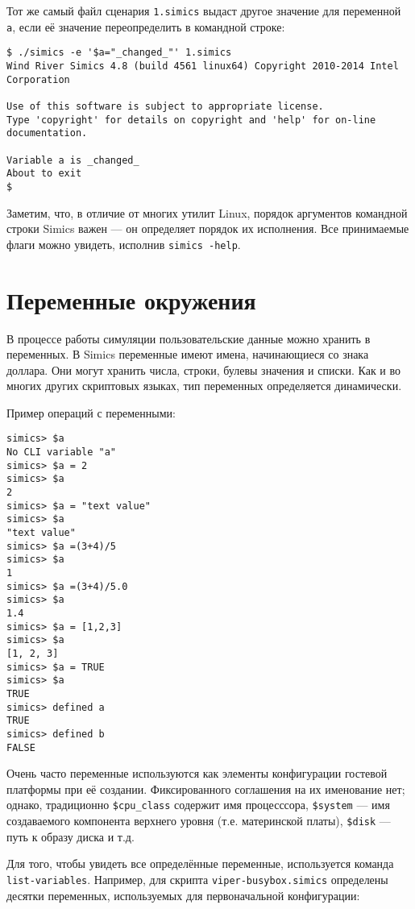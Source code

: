 \begin{enumerate*}
Тот же самый файл сценария \texttt{1.simics} выдаст другое значение для переменной \texttt{a}, если её значение переопределить в командной строке:

\begin{lstlisting}
$ ./simics -e '$a="_changed_"' 1.simics
Wind River Simics 4.8 (build 4561 linux64) Copyright 2010-2014 Intel Corporation

Use of this software is subject to appropriate license.
Type 'copyright' for details on copyright and 'help' for on-line documentation.

Variable a is _changed_
About to exit
$
\end{lstlisting}

Заметим, что, в отличие от многих утилит Linux, порядок аргументов командной строки Simics важен --- он определяет порядок их исполнения. Все принимаемые флаги можно увидеть, исполнив \texttt{simics -help}.
\end{enumerate*}

\section{Переменные окружения}

В процессе работы симуляции пользовательские данные можно хранить в переменных. В Simics переменные имеют имена, начинающиеся со знака доллара. Они могут хранить числа, строки, булевы значения и списки. Как и во многих других скриптовых языках, тип переменных определяется динамически. 

Пример операций с переменными:
\begin{lstlisting}
simics> $a
No CLI variable "a"
simics> $a = 2
simics> $a
2
simics> $a = "text value"
simics> $a
"text value"
simics> $a =(3+4)/5
simics> $a
1
simics> $a =(3+4)/5.0
simics> $a
1.4
simics> $a = [1,2,3]
simics> $a
[1, 2, 3]
simics> $a = TRUE
simics> $a
TRUE
simics> defined a
TRUE
simics> defined b
FALSE
\end{lstlisting}

Очень часто переменные используются как элементы конфигурации гостевой платформы при её создании. Фиксированного соглашения на их именование нет; однако, традиционно \texttt{\$cpu_class} содержит имя процесссора, \texttt{\$system} --- имя создаваемого компонента верхнего уровня (т.е. материнской платы), \texttt{\$disk} --- путь к образу диска и т.д.

Для того, чтобы увидеть все определённые переменные, используется команда \texttt{list-variables}. Например, для скрипта \texttt{viper-busybox.simics} определены десятки переменных, используемых для первоначальной конфигурации:

